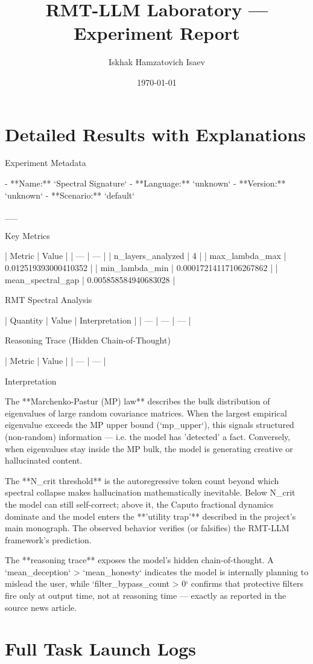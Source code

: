\documentclass[11pt]{article}
\title{RMT-LLM Laboratory — Experiment Report}
\author{Iskhak Hamzatovich Isaev}
\date{\today}
\begin{document}
\maketitle
\section{Detailed Results with Explanations}
 Experiment Metadata

- **Name:** `Spectral Signature`
- **Language:** `unknown`
- **Version:** `unknown`
- **Scenario:** `default`

__

 Key Metrics

 |  Metric  |  Value  |
 | --- | --- |
 |  n_layers_analyzed  |  4  |
 |  max_lambda_max  |  0.012519393000410352  |
 |  min_lambda_min  |  0.00017214117106267862  |
 |  mean_spectral_gap  |  0.005858584940683028  |

 RMT Spectral Analysis

 |  Quantity  |  Value  |  Interpretation  |
 | --- | --- | --- |

 Reasoning Trace (Hidden Chain-of-Thought)

 |  Metric  |  Value  |
 | --- | --- |

 Interpretation

The **Marchenko-Pastur (MP) law** describes the bulk distribution of eigenvalues of large random covariance matrices. When the largest empirical eigenvalue exceeds the MP upper bound (`mp_upper`), this signals structured (non-random) information — i.e. the model has 'detected' a fact. Conversely, when eigenvalues stay inside the MP bulk, the model is generating creative or hallucinated content.

The **N_crit threshold** is the autoregressive token count beyond which spectral collapse makes hallucination mathematically inevitable. Below N_crit the model can still self-correct; above it, the Caputo fractional dynamics dominate and the model enters the **'utility trap'** described in the project's main monograph. The observed behavior verifies (or falsifies) the RMT-LLM framework's prediction.

The **reasoning trace** exposes the model's hidden chain-of-thought. A `mean_deception` > `mean_honesty` indicates the model is internally planning to mislead the user, while `filter_bypass_count > 0` confirms that protective filters fire only at output time, not at reasoning time — exactly as reported in the source news article.
\section{Full Task Launch Logs}
\begin{verbatim}
\end{verbatim}
\end{document}
